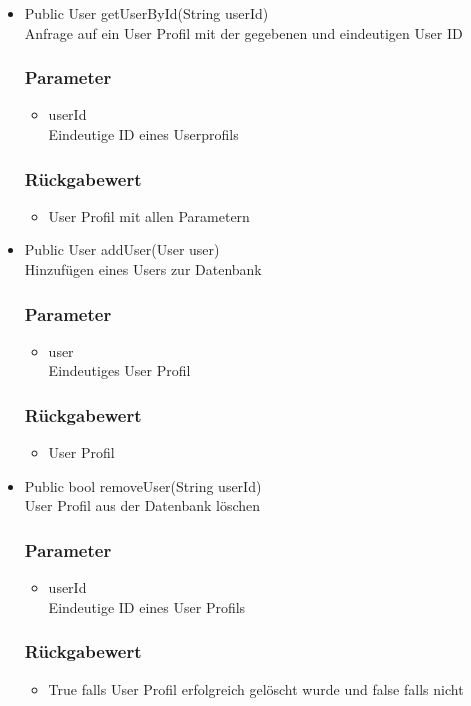 \documentclass[a4paper]{scrreprt}
\begin{document}
\begin{addmargin}[25pt]{0pt}
\begin{itemize}

\item Public User getUserById(String userId)\\
	Anfrage auf ein User Profil mit der gegebenen und eindeutigen User ID
	\subsubsection*{Parameter}
	\begin{itemize}
	\item userId \\
		Eindeutige ID eines Userprofils
	\end{itemize}
	\subsubsection*{Rückgabewert}
	\begin{itemize}
	\item User Profil mit allen Parametern 
	\end{itemize}

\item Public User addUser(User user)\\
	Hinzufügen eines Users zur Datenbank
	\subsubsection*{Parameter}
	\begin{itemize}
	\item user \\
		Eindeutiges User Profil
	\end{itemize}
	\subsubsection*{Rückgabewert}
	\begin{itemize}
	\item User Profil
	\end{itemize}
	
\item Public bool removeUser(String userId)\\
	User Profil aus der Datenbank löschen
	\subsubsection*{Parameter}
	\begin{itemize}
	\item userId \\
		Eindeutige ID eines User Profils
	\end{itemize}
	\subsubsection*{Rückgabewert}
	\begin{itemize}
	\item True falls User Profil erfolgreich gelöscht wurde und false falls nicht
	\end{itemize}
\end{itemize}
\end{addmargin}
\end{document}
